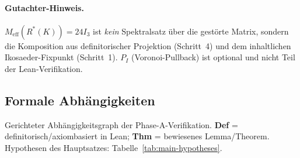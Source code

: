 \documentclass[11pt,a4paper]{article}
\begin{document}
	\paragraph{Gutachter-Hinweis.}
	$M_{\mathrm{eff}}(R^*(K))=24I_3$ ist \emph{kein} Spektralsatz über die gestörte Matrix,
	sondern die Komposition aus definitorischer Projektion (Schritt~4) und dem
	inhaltlichen Ikosaeder-Fixpunkt (Schritt~1).
	$P_I$ (Voronoi-Pullback) ist optional und nicht Teil der Lean-Verifikation.
	
	\subsection{Formale Abhängigkeiten}
	\label{sec:formal-deps}
	
	Gerichteter Abhängigkeitsgraph der Phase-A-Verifikation.
	\textbf{Def} = definitorisch/axiombasiert in Lean;
	\textbf{Thm} = bewiesenes Lemma/Theorem.
	Hypothesen des Hauptsatzes: Tabelle~\ref{tab:main-hypotheses}.
	
\end{document}
